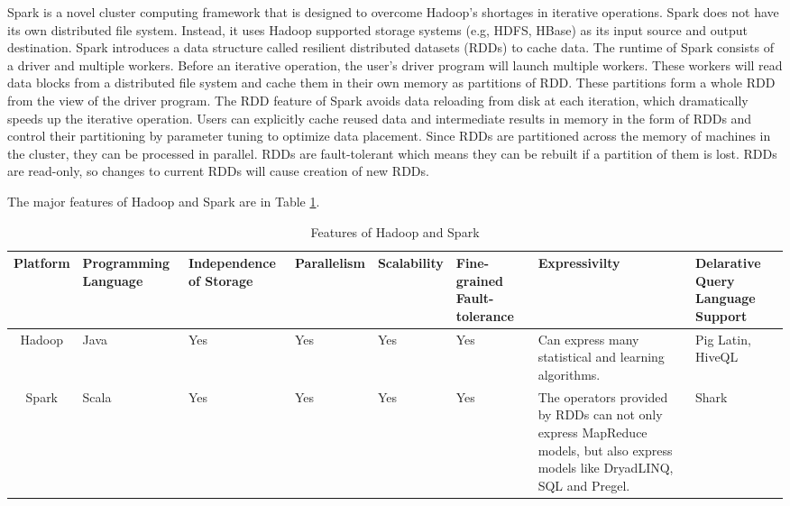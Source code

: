 \documentclass[12pt,conference,letterpaper]{IEEEtran}
\begin{document}
 
Spark is a novel cluster computing framework that is designed to overcome Hadoop's shortages in iterative operations. Spark does not have its own distributed file system. Instead, it uses Hadoop supported storage systems (e.g, HDFS, HBase) as its input source and output destination.  Spark introduces a data structure called resilient distributed datasets (RDDs)  to cache data. The runtime of Spark consists of a driver and multiple workers. Before an iterative operation, the user's driver program will launch multiple workers. These workers will read data blocks from a distributed file system and cache them in their own memory as partitions of RDD. These partitions form a whole RDD from the view of the driver program. The RDD feature of Spark avoids data reloading from disk at each iteration, which dramatically speeds up the iterative operation. Users can explicitly cache reused data and intermediate results in memory in the form of RDDs and control their partitioning by parameter tuning to optimize data placement. Since RDDs are partitioned across the memory of machines in the cluster, they can be processed in parallel. RDDs are fault-tolerant which means they can be rebuilt if a partition of them is lost. RDDs are read-only, so changes to current RDDs will cause creation of new RDDs.


The major features of Hadoop and Spark are in Table \ref{tab:feature_hdpspk}.

  \begin{table}[!t]
  \renewcommand{\arraystretch}{1.3}
  \centering
  \begin{tabular}{|c|m{1.5cm}<{\centering}|m{1.5cm}<{\centering}|m{1.5cm}<{\centering}|m{1.5cm}<{\centering}|m{2cm}<{\centering}|m{4cm}<{\centering}|m{2cm}<{\centering}|}
  \hline
  \bfseries Platform & \bfseries Programming Language & \bfseries Independence of Storage & \bfseries Parallelism & \bfseries Scalability & \bfseries Fine-grained Fault-tolerance & \bfseries Expressivilty & \bfseries Delarative Query Language Support\\
  \hline
  Hadoop & Java & Yes & Yes & Yes & Yes & Can express many statistical and learning algorithms. & Pig Latin, HiveQL \\
  \hline
  Spark & Scala & Yes & Yes & Yes & Yes  &The operators provided by RDDs can not only express MapReduce models, but also express models like DryadLINQ, SQL and Pregel. & Shark \\
  \hline
  \end{tabular}
  \caption{Features of Hadoop and Spark}
  \label{tab:feature_hdpspk}
  \end{table}
\end{document}
